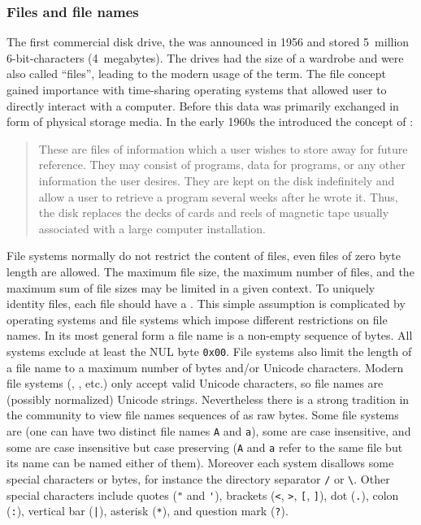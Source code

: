 \subsubsection{Files and file names}

The first commercial disk drive, the  was announced in 1956 and
stored 5~million 6-bit-characters (4~megabytes). The drives had the size of a
wardrobe and were also called ``files'', leading to the modern usage of the
term. The file concept gained importance with time-sharing operating systems
that allowed user to directly interact with a computer. Before this data was
primarily exchanged in form of physical storage media. In the early 1960s the
 introduced the concept of
:

\begin{quotation}%
These are files of information which a user wishes to store away for future
reference. They may consist of programs, data for programs, or any other
information the user desires. They are kept on the disk indefinitely and allow a
user to retrieve a program several weeks after he wrote it. Thus, the disk
replaces the decks of cards and reels of magnetic tape usually associated with a
large computer installation.\\
\quotationsource \textcite[p. 3]{Saltzer1965}
\end{quotation}\label{quot:files}

File systems normally do not restrict the content of files, even files of zero
byte length are allowed. The maximum file size, the maximum number of files,
and the maximum sum of file sizes may be limited in a given context.  To
uniquely identity files, each file should have a .  This simple
assumption is complicated by operating systems and file systems which impose
different restrictions on file names. In its most general form a file name is a
non-empty sequence of bytes. All systems exclude at least the NUL byte
\texttt{0x00}. File systems also limit the length of a file name to a maximum
number of bytes and/or Unicode characters. Modern file systems (,
,  etc.) only accept valid Unicode characters, so file
names are (possibly normalized) Unicode strings. Nevertheless there is a strong
tradition in the  community to view file names sequences of as raw
bytes. Some file systems are  (one can have two distinct
file names \verb|A| and \verb|a|), some are case insensitive, and some are case
insensitive but case preserving (\verb|A| and \verb|a| refer to the same file
but its name can be named either of them).  Moreover each system disallows some
special characters or bytes, for instance the directory separator \verb|/| or
\verb|\|. Other special characters include quotes (\verb|"| and \verb|'|),
brackets (\verb|<|, \verb|>|, \verb|[|, \verb|]|), dot (\verb|.|), colon
(\verb|:|), vertical bar (\verb#|#), asterisk (\verb|*|), and question mark
(\verb|?|).


